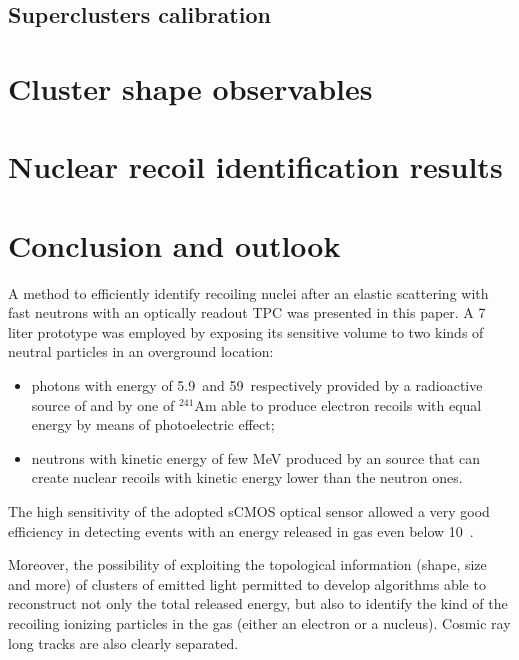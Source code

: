 \documentclass[12pt]{iopart}
\begin{document}
\clearpage

\subsection{Superclusters calibration}
\label{sec:calibration}



\section{Cluster shape observables}
\label{sec:clustershapes}


 
\section{Nuclear recoil identification results}
\label{sec:results}

 
\clearpage


 \section{Conclusion and outlook}

A method to efficiently identify recoiling nuclei after an elastic
scattering with fast neutrons with an optically readout TPC was
presented in this paper.  A 7 liter prototype was employed by exposing
its sensitive volume to two kinds of neutral particles in an
overground location:
\begin{itemize}
\item photons with energy of 5.9~\keV and 59~\keV respectively
  provided by a radioactive source of \fe and by one of $^{241}$Am
  able to produce electron recoils with equal energy by means of
  photoelectric effect;
\item neutrons with kinetic energy of few MeV produced by an \ambe
  source that can create nuclear recoils with kinetic energy lower
  than the neutron ones.
\end{itemize}

The high sensitivity of the adopted sCMOS optical sensor allowed a
very good efficiency in detecting events with an energy released in
gas even below 10~\keV.

Moreover, the possibility of exploiting the topological information
(shape, size and more) of clusters of emitted light permitted to
develop algorithms able to reconstruct not only the total released
energy, but also to identify the kind of the recoiling ionizing
particles in the gas (either an electron or a nucleus). Cosmic ray
long tracks are also clearly separated.
\end{document}
